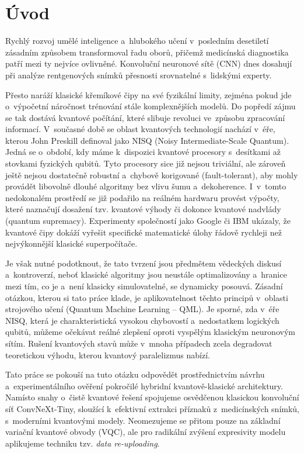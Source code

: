 \documentclass[12pt, a4paper]{report}
\begin{document}
\newpage
\tableofcontents

\newpage

\chapter{Úvod} \label{chap:uvod}

Rychlý rozvoj umělé inteligence a~hlubokého učení v~posledním desetiletí zásadním způsobem transformoval řadu oborů, přičemž medicínská diagnostika patří mezi ty nejvíce ovlivněné. Konvoluční neuronové sítě (CNN) dnes dosahují při analýze rentgenových snímků přesnosti srovnatelné s~lidskými experty.

Přesto naráží klasické křemíkové čipy na své fyzikální limity, zejména pokud jde o~výpočetní náročnost trénování stále komplexnějších modelů. Do popředí zájmu se tak dostává kvantové počítání, které slibuje revoluci ve~způsobu zpracování informací. V~současné době se oblast kvantových technologií nachází v~éře, kterou John Preskill definoval jako NISQ (Noisy Intermediate-Scale Quantum). Jedná se o~období, kdy máme k~dispozici kvantové procesory s~desítkami až stovkami fyzických qubitů. Tyto procesory sice již nejsou triviální, ale zároveň ještě nejsou dostatečně robustní a~chybově korigované (fault-tolerant), aby mohly provádět libovolně dlouhé algoritmy bez vlivu šumu a~dekoherence. I~v~tomto nedokonalém prostředí se již podařilo na reálném hardwaru provést výpočty, které naznačují dosažení tzv. kvantové výhody či dokonce kvantové nadvlády (quantum supremacy). Experimenty společností jako Google či IBM ukázaly, že kvantové čipy dokáží vyřešit specifické matematické úlohy řádově rychleji než nejvýkonnější klasické superpočítače.

Je však nutné podotknout, že tato tvrzení jsou předmětem vědeckých diskusí a~kontroverzí, neboť klasické algoritmy jsou neustále optimalizovány a~hranice mezi tím, co je a~není klasicky simulovatelné, se dynamicky posouvá. Zásadní otázkou, kterou si tato práce klade, je aplikovatelnost těchto principů v~oblasti strojového učení (Quantum Machine Learning -- QML). Je sporné, zda v~éře NISQ, která je charakteristická vysokou chybovostí a~nedostatkem logických qubitů, můžeme očekávat reálné zlepšení oproti vyspělým klasickým neuronovým sítím. Rušení kvantových stavů může v~mnoha případech zcela degradovat teoretickou výhodu, kterou kvantový paralelizmus nabízí.

Tato práce se pokouší na tuto otázku odpovědět prostřednictvím návrhu a~experimentálního ověření pokročilé hybridní kvantově-klasické architektury. Namísto snahy o~čistě kvantové řešení spojujeme osvědčenou klasickou konvoluční síť ConvNeXt-Tiny, sloužící k~efektivní extrakci příznaků z~medicínských snímků, s~moderními kvantovými modely. Neomezujeme se přitom pouze na základní variační kvantové obvody (VQC), ale pro radikální zvýšení expresivity modelu aplikujeme techniku tzv. \textit{data re-uploading}.
\end{document}
